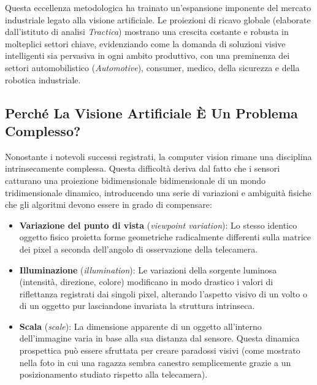 ﻿\documentclass[11pt, a4paper]{article}
\begin{document}

Questa eccellenza metodologica ha trainato un'espansione imponente del mercato industriale legato alla visione artificiale. Le proiezioni di ricavo globale (elaborate dall'istituto di analisi \emph{Tractica}) mostrano una crescita costante e robusta in molteplici settori chiave, evidenziando come la domanda di soluzioni visive intelligenti sia pervasiva in ogni ambito produttivo, con una preminenza dei settori automobilistico (\emph{Automotive}), consumer, medico, della sicurezza e della robotica industriale.


\newpage

\subsection{Perché La Visione Artificiale È Un Problema Complesso?}

Nonostante i notevoli successi registrati, la computer vision rimane una disciplina intrinsecamente complessa. Questa difficoltà deriva dal fatto che i sensori catturano una proiezione bidimensionale bidimensionale di un mondo tridimensionale dinamico, introducendo una serie di variazioni e ambiguità fisiche che gli algoritmi devono essere in grado di compensare:

\begin{itemize}[noitemsep]
    \item \textbf{Variazione del punto di vista} (\emph{viewpoint variation}): Lo stesso identico oggetto fisico proietta forme geometriche radicalmente differenti sulla matrice dei pixel a seconda dell'angolo di osservazione della telecamera.
    \item \textbf{Illuminazione} (\emph{illumination}): Le variazioni della sorgente luminosa (intensità, direzione, colore) modificano in modo drastico i valori di riflettanza registrati dai singoli pixel, alterando l'aspetto visivo di un volto o di un oggetto pur lasciandone invariata la struttura intrinseca.
    \item \textbf{Scala} (\emph{scale}): La dimensione apparente di un oggetto all'interno dell'immagine varia in base alla sua distanza dal sensore. Questa dinamica prospettica può essere sfruttata per creare paradossi visivi (come mostrato nella foto in cui una ragazza sembra canestro semplicemente grazie a un posizionamento studiato rispetto alla telecamera).
\end{itemize}
\end{document}
